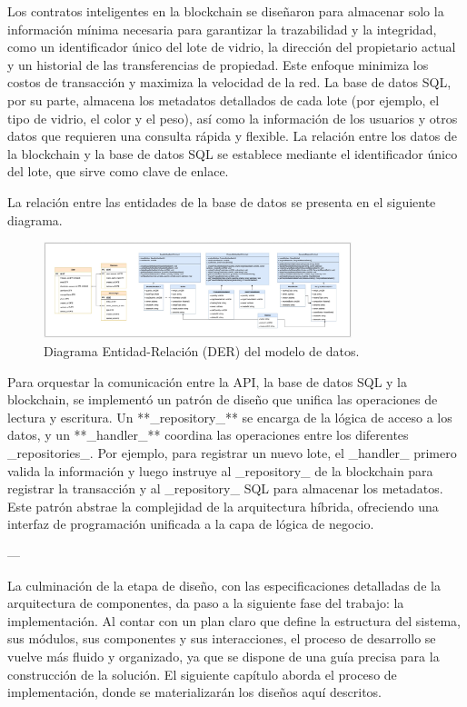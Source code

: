 Los contratos inteligentes en la blockchain se diseñaron para almacenar solo la información mínima necesaria para garantizar la trazabilidad y la integridad, como un identificador único del lote de vidrio, la dirección del propietario actual y un historial de las transferencias de propiedad. Este enfoque minimiza los costos de transacción y maximiza la velocidad de la red. La base de datos SQL, por su parte, almacena los metadatos detallados de cada lote (por ejemplo, el tipo de vidrio, el color y el peso), así como la información de los usuarios y otros datos que requieren una consulta rápida y flexible. La relación entre los datos de la blockchain y la base de datos SQL se establece mediante el identificador único del lote, que sirve como clave de enlace.

La relación entre las entidades de la base de datos se presenta en el siguiente diagrama.
\begin{figure}[!htpb]
    \centering
    \includegraphics[width=0.8\textwidth]{Figures/database-der.jpeg}
    \caption{Diagrama Entidad-Relación (DER) del modelo de datos.}
    \label{fig:erd}
\end{figure}

Para orquestar la comunicación entre la API, la base de datos SQL y la blockchain, se implementó un patrón de diseño que unifica las operaciones de lectura y escritura. Un **_repository_** se encarga de la lógica de acceso a los datos, y un **_handler_** coordina las operaciones entre los diferentes _repositories_. Por ejemplo, para registrar un nuevo lote, el _handler_ primero valida la información y luego instruye al _repository_ de la blockchain para registrar la transacción y al _repository_ SQL para almacenar los metadatos. Este patrón abstrae la complejidad de la arquitectura híbrida, ofreciendo una interfaz de programación unificada a la capa de lógica de negocio.

---

La culminación de la etapa de diseño, con las especificaciones detalladas de la arquitectura de componentes, da paso a la siguiente fase del trabajo: la implementación. Al contar con un plan claro que define la estructura del sistema, sus módulos, sus componentes y sus interacciones, el proceso de desarrollo se vuelve más fluido y organizado, ya que se dispone de una guía precisa para la construcción de la solución. El siguiente capítulo aborda el proceso de implementación, donde se materializarán los diseños aquí descritos.